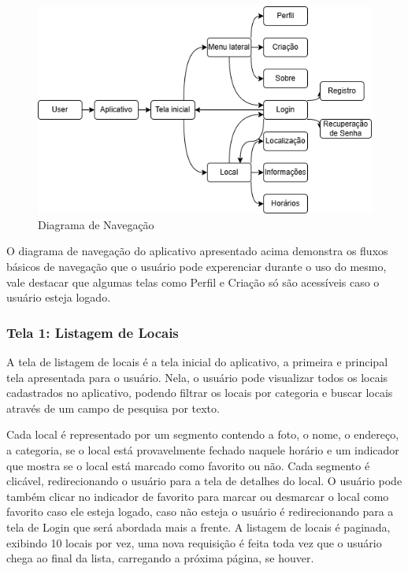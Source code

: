     \begin{figure}[h]
        \centering
        \includegraphics[width=1\textwidth]{imagens/navegacao.png}
        \caption{\scriptsize Diagrama de Navegação}
        \label{fig:diagrama-navegacao}
    \end{figure}

    O diagrama de navegação do aplicativo apresentado acima demonstra os fluxos básicos de navegação que o usuário pode experenciar
    durante o uso do mesmo, vale destacar que algumas telas como Perfil e Criação só são acessíveis caso o usuário esteja logado.

    \FloatBarrier

\subsubsection{Tela 1: Listagem de Locais}

    A tela de listagem de locais é a tela inicial do aplicativo, a primeira e principal tela apresentada para o usuário. Nela, o usuário pode visualizar todos os locais cadastrados no aplicativo, podendo filtrar os locais por categoria e buscar locais através de um campo de pesquisa por texto. 
    
    Cada local é representado por um segmento contendo a foto, o nome, o endereço, a categoria, se o local está provavelmente fechado naquele horário e um indicador que mostra se o local está marcado como favorito ou não. Cada segmento é clicável, redirecionando o usuário para a tela de detalhes do local. O usuário pode também clicar no indicador de favorito para marcar ou desmarcar o local como favorito caso ele esteja logado, caso não esteja o usuário é redirecionando para a tela de Login que será abordada mais a frente. A listagem de locais é paginada, exibindo 10 locais por vez, uma nova requisição é feita toda vez que o usuário chega ao final da lista, carregando a próxima página, se houver.

